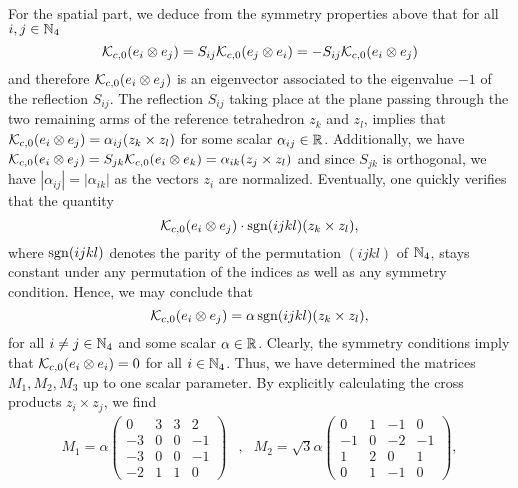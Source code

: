 For the spatial part, we deduce from the symmetry properties above that for all $i, j \in \mathbb{N}_4$	
\begin{equation}
	\mathcal{K}_{c,0}(e_i \otimes e_j) = S_{ij} \mathcal{K}_{c,0}(e_j \otimes e_i) = -S_{ij} \mathcal{K}_{c,0}(e_i \otimes e_j)
\end{equation}
and therefore $\mathcal{K}_{c,0}(e_i \otimes e_j)$ is an eigenvector associated to the eigenvalue $-1$ of the reflection $S_{ij}$. The reflection $S_{ij}$ taking place at the plane passing through the two remaining arms of the reference tetrahedron $z_k$ and $z_l$, implies that $\mathcal{K}_{c,0}(e_i \otimes e_j) = \alpha_{ij}( z_k \times z_l)$ for some scalar $\alpha_{ij} \in \mathbb{R}$. Additionally, we have $\mathcal{K}_{c,0}(e_i \otimes e_j) = S_{jk} \mathcal{K}_{c,0}(e_i \otimes e_k) = \alpha_{ik}(z_j \times z_l)$ and since $S_{jk}$ is orthogonal, we have $|\alpha_{ij}| = |\alpha_{ik}|$ as the vectors $z_i$ are normalized. Eventually, one quickly verifies that the quantity
\begin{equation}
	\mathcal{K}_{c,0}(e_i \otimes e_j) \cdot \operatorname{sgn}(ijkl) (z_k \times z_l),
\end{equation}
where $\operatorname{sgn}(ijkl)$ denotes the parity of the permutation $(ijkl)$ of $\mathbb{N}_4$, stays constant under any permutation of the indices as well as any symmetry condition. Hence, we may conclude that
\begin{equation}
	\mathcal{K}_{c,0}(e_i \otimes e_j) = \alpha \operatorname{sgn}(ijkl) (z_k \times z_l),
\end{equation}
for all $i \neq j \in \mathbb{N}_4$ and some scalar $\alpha \in \mathbb{R}$. Clearly, the symmetry conditions imply that $\mathcal{K}_{c,0}(e_i \otimes e_i) = 0$ for all $i \in  \mathbb{N}_4$. Thus, we have determined the matrices $M_1, M_2, M_3$ up to one scalar parameter. By explicitly calculating the cross products $z_i \times z_j$, we find
\renewcommand{\arraystretch}{1.1}
\begin{align}
\label{eq: M1 and M2}
M_1 = \alpha \left ( \begin{array}{cccc}
0 & 3 & 3 & 2 \\ 
-3 & 0 & 0 & -1 \\ 
-3 & 0 & 0 & -1 \\ 
-2 & 1 & 1 & 0
\end{array} \right ) &, &
M_2 = \sqrt{3} \alpha \left (
\begin{array}{cccc}
0 & 1 & -1 & 0 \\ 
-1 & 0 & -2 & -1 \\ 
1 & 2 & 0 & 1 \\ 
0 & 1 & -1 & 0
\end{array} \right),
\end{align}
